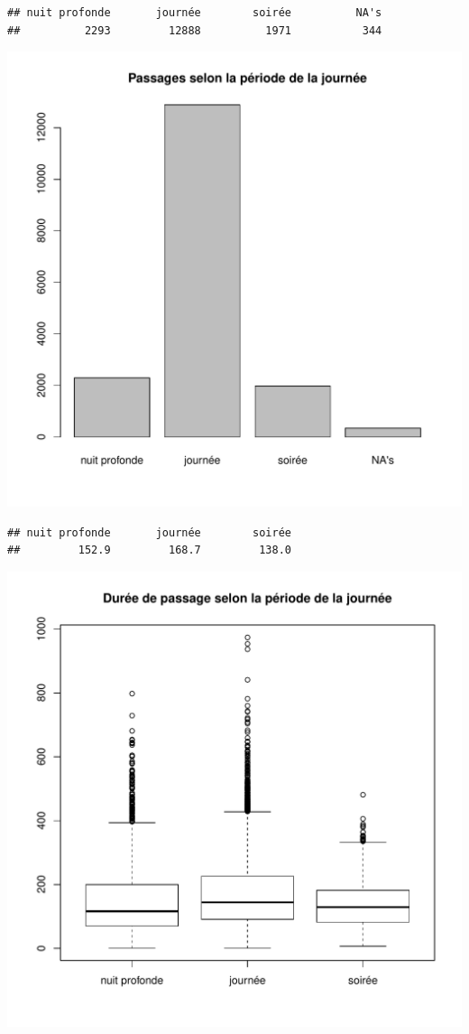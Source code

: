 \documentclass[12pt,english,french,twoside]{report}\usepackage[]{graphicx}\usepackage[]{color}
\makeatletter
\def\maxwidth{ %
  \ifdim\Gin@nat@width>\linewidth
    \linewidth
  \else
    \Gin@nat@width
  \fi
}
\newenvironment{kframe}{%
 \def\at@end@of@kframe{}%
 \ifinner\ifhmode%
  \def\at@end@of@kframe{\end{minipage}}%
  \begin{minipage}{\columnwidth}%
 \fi\fi%
 \def\FrameCommand##1{\hskip\@totalleftmargin \hskip-\fboxsep
 \colorbox{shadecolor}{##1}\hskip-\fboxsep
     \hskip-\linewidth \hskip-\@totalleftmargin \hskip\columnwidth}%
 \MakeFramed {\advance\hsize-\width
   \@totalleftmargin\z@ \linewidth\hsize
   \@setminipage}}%
 {\par\unskip\endMakeFramed%
 \at@end@of@kframe}
\newenvironment{knitrout}{}{} %
\makeatother
\begin{document}
\begin{knitrout}
\color{fgcolor}\begin{kframe}
\begin{verbatim}
## nuit profonde       journée        soirée          NA's 
##          2293         12888          1971           344
\end{verbatim}
\end{kframe}
\includegraphics[width=\maxwidth]{figure/duree_heure1} 
\begin{kframe}\begin{verbatim}
## nuit profonde       journée        soirée 
##         152.9         168.7         138.0
\end{verbatim}
\end{kframe}
\includegraphics[width=\maxwidth]{figure/duree_heure2} 


\end{knitrout}
\end{document}
